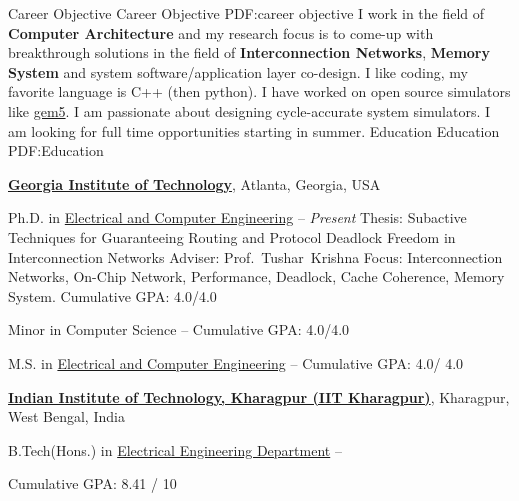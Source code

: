 \documentclass[letterpaper,MMMyyyy,nonstopmode]{simpleresumecv}
\begin{document}
\begin{Body}

\Section
{Career Objective}
{Career Objective}
{PDF:career objective}
I work in the field of \textbf{Computer Architecture} and my research focus is to come-up with breakthrough solutions in the field of \textbf{Interconnection Networks}, \textbf{Memory System} and system software/application layer co-design. I like coding, my favorite language is C++ (then python). I have worked on open source simulators like \href{http://www.gem5.org}{{gem5}}. I am passionate about designing cycle-accurate system simulators. I am looking for full time opportunities starting in summer.
\vspace{-2mm}
\Section
{Education}
{Education}
{PDF:Education}

\Entry
\href{https://www.gatech.edu/}
{\textbf{Georgia Institute of Technology}},
Atlanta, Georgia, USA

\Gap
\BulletItem
Ph.D. in
\href{https://www.ece.gatech.edu/}
{Electrical and Computer Engineering}
\hfill
{} --
\textit{Present}
\SubBulletItem
Thesis:
{Subactive Techniques for Guaranteeing Routing and Protocol Deadlock Freedom in Interconnection Networks}
\SubBulletItem
Adviser:
Prof.~Tushar~Krishna
\SubBulletItem
Focus:
Interconnection Networks, On-Chip Network, Performance, Deadlock, Cache Coherence, Memory System.
\SubBulletItem
Cumulative GPA: 4.0/4.0

\Gap
\BulletItem
Minor in Computer Science
\hfill
{} --
\SubBulletItem
Cumulative GPA: 4.0/4.0

\Gap
\BulletItem
M.S. in
\href{https://www.ece.gatech.edu/}
{Electrical and Computer Engineering}
\hfill
{} --
\SubBulletItem
Cumulative GPA: 4.0/ 4.0

\BigGap
\Entry
\href{http://www.iitkgp.ac.in/}
{\textbf{Indian Institute of Technology, Kharagpur (IIT Kharagpur)}},
Kharagpur, West Bengal, India

\Gap
\BulletItem
B.Tech(Hons.) in
\href{http://www.ee.iitkgp.ac.in/}
{Electrical Engineering Department}
\hfill
{} --
\begin{Detail}
\SubBulletItem
Cumulative GPA: 8.41 / 10
\end{Detail}
\vspace{-2mm}


\end{Body}
\end{document}
